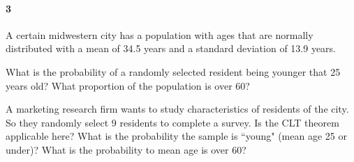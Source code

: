 \documentclass{article}
\begin{document}
\begin{flushleft}
\paragraph{3} A certain midwestern city has a population with ages that are normally distributed with a mean of 34.5 years and a standard deviation of 13.9 years.
\begin{enumalpha}
\item What is the probability of a randomly selected resident being younger that 25 years old? What proportion of the population is over 60?
\vspace{3.25in}
\item A marketing research firm wants to study characteristics of residents of the city. So they randomly select 9 residents to complete a survey. Is the CLT theorem applicable here? What is the probability the sample is ``young" (mean age 25 or under)? What is the probability to mean age is over 60?
\end{enumalpha}


\end{flushleft}
\end{document}
